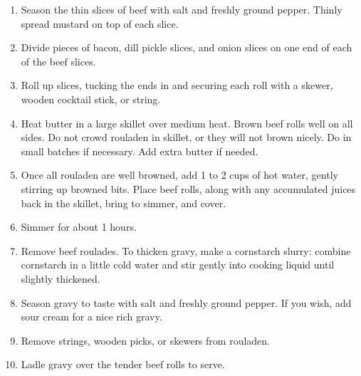 \begin{enumerate}
  \item Season the thin slices of beef with salt and freshly ground pepper. Thinly spread
    mustard on top of each slice.
  \item Divide pieces of bacon, dill pickle slices, and onion slices on one end of each of the
    beef slices.
  \item Roll up slices, tucking the ends in and securing each roll with a skewer, wooden
    cocktail stick, or string.
  \item Heat butter in a large skillet over medium heat. Brown beef rolls well on all sides. Do
    not crowd rouladen in skillet, or they will not brown nicely. Do in small batches if
    necessary. Add extra butter if needed.
  \item Once all rouladen are well browned, add 1 to 2 cups of hot water, gently stirring up
    browned bits. Place beef rolls, along with any accumulated juices back in the skillet, bring
    to simmer, and cover.
  \item Simmer for about 1 hours.
  \item Remove beef roulades. To thicken gravy, make a cornstarch slurry: combine cornstarch in
    a little cold water and stir gently into cooking liquid until slightly thickened.
  \item Season gravy to taste with salt and freshly ground pepper. If you wish, add sour cream
    for a nice rich gravy.
  \item Remove strings, wooden picks, or skewers from rouladen.
  \item Ladle gravy over the tender beef rolls to serve.
\end{enumerate}

